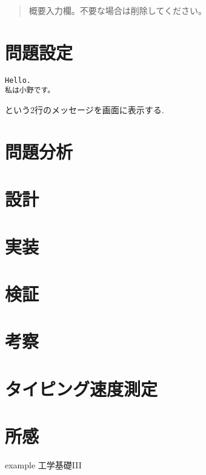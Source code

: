 \documentclass[a4paper, xelatex, ja=standard, 10.5pt]{bxjsarticle}
\begin{document}
\begin{abstract}
概要入力欄。不要な場合は削除してください。
\end{abstract}

\tableofcontents

\section{問題設定}
\begin{lstlisting}
Hello.
私は小野です。
\end{lstlisting}
という2行のメッセージを画面に表示する.


\section{問題分析}
\section{設計}
\section{実装}
\section{検証}
\section{考察}
\section{タイピング速度測定}
\section{所感}

\begin{thebibliography}{9} %
  example 工学基礎I\hspace{-1.2pt}I\hspace{-1.2pt}I
\end{thebibliography}
\end{document}
